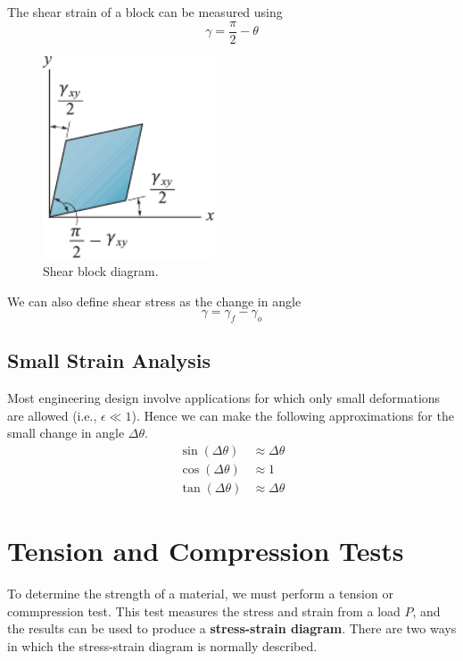 \documentclass{article}
\begin{document}
The shear strain of a block can be measured using
\begin{equation*}
    \gamma = \frac{\pi}{2} - \theta
\end{equation*}
\begin{figure}[H]
    \centering
    \includegraphics[height = 6cm, keepaspectratio = true]{figures/shear_block.pdf}
    \caption{Shear block diagram.}
\end{figure}
We can also define shear stress as the change in angle
\begin{equation*}
    \gamma = \gamma_f - \gamma_o
\end{equation*}
\subsection{Small Strain Analysis}
Most engineering design involve applications for which only small deformations are allowed
(i.e., \(\epsilon \ll 1\)).
Hence we can make the following approximations for the small change in angle \(\Delta{\theta}\).
\begin{align*}
    \sin{\left( \Delta{\theta} \right)} & \approx \Delta{\theta} \\
    \cos{\left( \Delta{\theta} \right)} & \approx 1              \\
    \tan{\left( \Delta{\theta} \right)} & \approx \Delta{\theta}
\end{align*}
\section{Tension and Compression Tests}
To determine the strength of a material, we must perform a tension or commpression test.
This test measures the stress and strain from a load \(P\), and the results can be used to
produce a \textbf{stress-strain diagram}.
There are two ways in which the stress-strain diagram is normally described.
\end{document}
